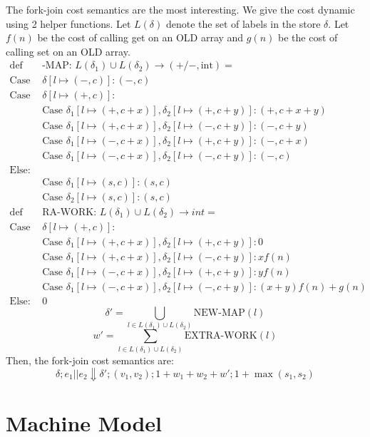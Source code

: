 \documentclass[preprint]{sigplanconf}
\begin{document}
The fork-join cost semantics are the most interesting. We give the cost dynamic using 2 helper functions. Let $L(\delta)$ denote the set of labels in the store $\delta$. Let $f(n)$ be the cost of calling get on an OLD array and $g(n)$ be the cost of calling set on an OLD array.
\begin{align*}
\text{def NEW}&\text{-MAP: }L(\delta_1) \cup L(\delta_2) \to (+/-, \text{int}) = \\
\text{Case } &\delta[l \mapsto (-,c)]: (-, c)  \\
\text{Case } &\delta[l \mapsto (+,c)]:  \\
&\text{Case } \delta_1[l \mapsto (+,c+x)], \delta_2[l \mapsto (+,c+y)]: (+, c+x+y) \\
&\text{Case } \delta_1[l \mapsto (+,c+x)], \delta_2[l \mapsto (-,c+y)]: (-, c+y) \\
&\text{Case } \delta_1[l \mapsto (-,c+x)], \delta_2[l \mapsto (+,c+y)]: (-, c+x) \\
&\text{Case } \delta_1[l \mapsto (-,c+x)], \delta_2[l \mapsto (-,c+y)]: (-, c) \\
\text{Else: } & \\
&\text{Case } \delta_1[l \mapsto (s,c)]: (s,c) \\
&\text{Case } \delta_2[l \mapsto (s,c)]: (s,c) \\
\text{def EXT}&\text{RA-WORK: }L(\delta_1) \cup L(\delta_2) \to int = \\
\text{Case } &\delta[l \mapsto (+,c)]:  \\
&\text{Case } \delta_1[l \mapsto (+,c+x)], \delta_2[l \mapsto (+,c+y)]: 0 \\
&\text{Case } \delta_1[l \mapsto (+,c+x)], \delta_2[l \mapsto (-,c+y)]: x f(n) \\
&\text{Case } \delta_1[l \mapsto (-,c+x)], \delta_2[l \mapsto (+,c+y)]: y f(n) \\
&\text{Case } \delta_1[l \mapsto (-,c+x)], \delta_2[l \mapsto (-,c+y)]: (x+y)f(n) + g(n) \\
\text{Else: } & 0
\end{align*}											
$$\delta' = \bigcup_{l \in L(\delta_1) \cup L(\delta_2)} \text{NEW-MAP} (l)$$
$$w' = \sum_{l \in L(\delta_1) \cup L(\delta_2)} \text{EXTRA-WORK} (l)$$
Then, the fork-join cost semantics are:
$$\delta; e_1 || e_2 \Downarrow \delta'; (v_1, v_2); 1 + w_1 + w_2 + w'; 1 + \max(s_1, s_2)$$

\section{Machine Model}
\end{document}
